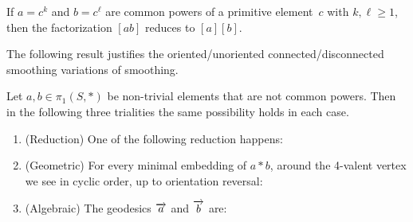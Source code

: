 \begin{proposition}
  \label{prop:crossings-powers}
  If $a = c^k$ and $b = c^\ell$ are common powers of a primitive
  element~$c$ with $k,\ell \ge 1$, then the factorization $[ab]$
  reduces to $[a][b]$.
\end{proposition}

The following result justifies the oriented/unoriented connected/disconnected smoothing variations of smoothing.

\begin{proposition}
  \label{prop:crossings-triality}
  Let $a,b \in \pi_1(S,*)$ be non-trivial elements that are not
  common powers. Then in the following three trialities the same
  possibility holds in each case.
  \begin{enumerate}
  \item (Reduction) One of the following reduction happens:\\
  \item\label{item:triality-geom}
    (Geometric) For every minimal embedding of $a * b$, around the
    4-valent vertex we see in cyclic
    order, up to orientation reversal:\\
  \item\label{item:triality-alg} (Algebraic) The geodesics $\overrightarrow{a}$ and $\overrightarrow{b}$ are:\\
  \end{enumerate}
\end{proposition}

